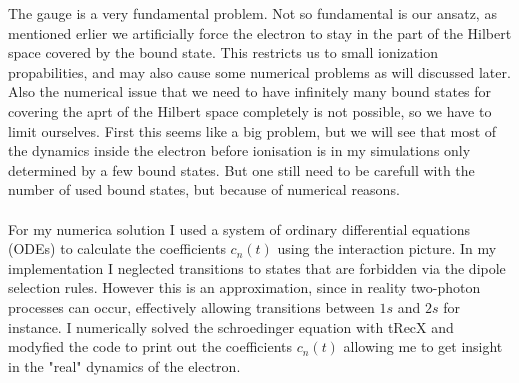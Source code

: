 



The gauge is a very fundamental problem. Not so fundamental is our ansatz, as mentioned erlier we artificially force the electron to stay in the part of the Hilbert space covered by the bound state.
This restricts us to small ionization propabilities, and may also cause some numerical problems as will discussed later.\\ %
Also the numerical issue that we need to have infinitely many bound states for covering the aprt of the Hilbert space completely is not possible, so we have to limit ourselves.
First this seems like a big problem, but we will see that most of the dynamics inside the electron before ionisation is in my simulations only determined by a few bound states.
But one still need to be carefull with the number of used bound states, but because of numerical reasons.\\\\

For my numerica solution I used a system of ordinary differential equations (ODEs) to calculate the coefficients $c_n(t)$ using the interaction picture.
In my implementation I neglected transitions to states that are forbidden via the dipole selection rules. 
However this is an approximation, since in reality two-photon processes can occur, effectively allowing transitions between $1s$ and $2s$ for instance. 
I numerically solved the schroedinger equation with tRecX and modyfied the code to print out the coefficients $c_n(t)$ allowing me to get insight in the "real" dynamics of the electron.


